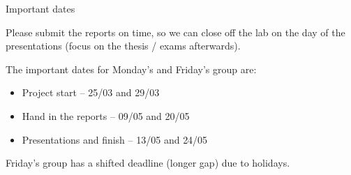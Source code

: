\documentclass[11pt,t]{beamer}
\begin{document}
\begin{frame}{Important dates}

Please submit the reports on time, so we can close off the lab on the day of the presentations (focus on the thesis / exams afterwards).

\vspace{6mm}

The important dates for {\color{olive}Monday's} and {\color{Plum}Friday's} group are:
\vspace{2mm}
\begin{itemize}\setlength\itemsep{0.75em}
    \item Project start -- {\color{olive}25/03} and {\color{Plum}29/03}
    \item Hand in the reports -- {\color{olive}09/05} and {\color{Plum}20/05}
    \item Presentations and finish -- {\color{olive}13/05} and {\color{Plum}24/05}
\end{itemize}

\vspace{4mm}

{\footnotesize Friday's group has a shifted deadline (longer gap) due to holidays.}

\end{frame}
\end{document}
